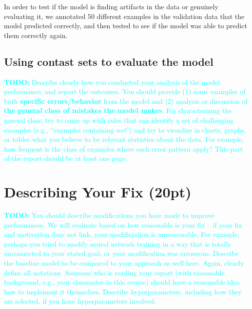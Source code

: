 \documentclass[twocolumn]{article}
\newcommand{\todo}[1]{\textcolor{cyan}{\textbf{TODO:} #1}}
\begin{document}
In order to test if the model is finding artifacts in the data or genuinely
evaluating it, we annotated 50 different examples in the validation data that
the model predicted correctly, and then tested to see if the model was able to
predict them correctly again.





\subsection{Using contast sets to evaluate the model}

\todo{Describe clearly how you conducted your analysis of the model
performance, and report the outcomes. You should provide (1) some examples of
both \textbf{specific errors/behavior} from the model and (2) analysis or
discussion of \textbf{the general class of mistakes the model makes}. For
characterizing the general class, try to come up with rules that can identify
a set of challenging examples (e.g., ``examples containing \emph{not}'') and
try to visualize in charts, graphs, or tables what you believe to be relevant
statistics about the data. For example, how frequent is the class of examples
where such error pattern apply? This part of the report should be at least one
page.}


\section{Describing Your Fix (20pt)}


\todo{You should describe modifications you have made to improve performances.
We will evaluate based on how reasonable is your fix  -- if your fix and
motivation does not link, your modificiation is unreasonable. For example,
perhaps you tried to modify neural network training in a way that is totally
unconnected to your stated goal, or your modification was erroneous. Describe
the baseline model to be compared to your approach as well here. Again, clearly
define all notations. Someone who is reading your report (with reasonable
background, e.g., your classmates in this course) should have a reasonable idea
how to implement it themselves. Describe hyperparameters, including how they
are selected, if you have hyperparameters involved. }
\end{document}
